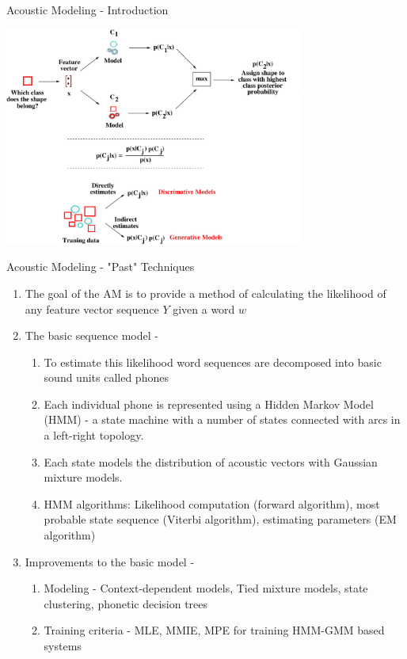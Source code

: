 \begin{frame}{Acoustic Modeling - Introduction}
\begin{center}
\includegraphics[height=72mm]{figures/am}
\end{center}
\end{frame}

\begin{frame}{Acoustic Modeling - "Past" Techniques}
\begin{enumerate}
\item The \alert{goal of the AM} is to provide a method of calculating the likelihood
of any feature vector sequence $Y$ given a word $w$
\item \alert{The basic \alert{sequence} model} -
\begin{enumerate}
\item To estimate this likelihood word sequences are decomposed into basic sound units
called phones
\item Each individual phone is represented using a Hidden Markov Model (HMM) - a state machine with 
a number of states connected with arcs in a left-right topology.
\item Each state models the distribution of acoustic vectors with Gaussian mixture models.
\item HMM algorithms: Likelihood computation (forward algorithm), most probable state sequence (Viterbi algorithm), 
estimating parameters (EM algorithm)
\end{enumerate}
\item \alert{Improvements to the basic model} -
\begin{enumerate}
\item Modeling - Context-dependent models, Tied mixture models, state clustering, phonetic decision trees
\item Training criteria - MLE, MMIE, MPE for training HMM-GMM based systems
\end{enumerate}
\end{enumerate}
\end{frame}

